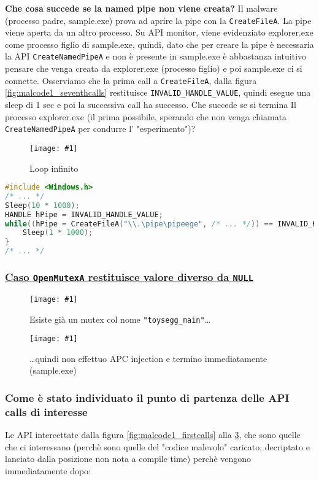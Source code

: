 \documentclass[
    a4paper, %
    11pt %
]{article}
\newcommand{\pic}[4]{\begin{figure}[H]
            \centering
            \texttt{[image: \#1]}
            \caption{#2}
            \label{fig:#1}
            \end{figure}}
\begin{document}
            \textbf{Che cosa succede se la named pipe non viene creata?}
            Il malware (processo padre, sample.exe) prova ad aprire la pipe con la \texttt{CreateFileA}. La pipe viene aperta da un altro 
            processo. Su API monitor, viene evidenziato explorer.exe come processo figlio di
            sample.exe, quindi, dato che per creare la pipe è necessaria la API \texttt{CreateNamedPipeA}
            e non è presente in sample.exe è abbastanza intuitivo pensare che venga creata da explorer.exe (processo figlio) e poi sample.exe ci si connette.
            Osserviamo che la prima call a \texttt{CreateFileA}, dalla figura \ref{fig:malcode1_seventhcalls}
            restituisce \texttt{INVALID\_HANDLE\_VALUE}, quindi esegue una sleep di 1 sec e poi la successiva call
            ha successo. Che succede se si termina Il processo explorer.exe (il prima possibile, sperando che
            non venga chiamata \texttt{CreateNamedPipeA} per condurre l' "esperimento")?
            \pic{malcode3_killchild}{Loop infinito}{13cm}{4cm}

            \begin{lstlisting}[language=C]
#include <Windows.h>
/* ... */
Sleep(10 * 1000);
HANDLE hPipe = INVALID_HANDLE_VALUE;
while((hPipe = CreateFileA("\\.\pipe\pipeege", /* ... */)) == INVALID_HANDLE_VALUE) {
    Sleep(1 * 1000);
}
/* ... */
            \end{lstlisting}

            \subsubsection*{\underline{Caso \texttt{OpenMutexA} restituisce valore diverso da \texttt{NULL}}}
            \pic{malcode2_fifthcalls}{Esiste già un mutex col nome \texttt{"toysegg\_main"}\dots}{11cm}{1.5cm}
            \pic{malcode2_sixthcalls}{\dots quindi non effettuo APC injection e termino immediatamente (sample.exe)}{3cm}{0.75cm}

            \subsubsection*{Come è stato individuato il punto di partenza delle API calls di interesse}

            Le API intercettate dalla figura \ref{fig:malcode1_firstcalls} alla \ref{fig:malcode2_sixthcalls},
            che sono quelle che ci interessano (perchè sono quelle del "codice malevolo" caricato, decriptato e 
            lanciato dalla posizione non nota a compile time) perchè vengono immediatamente dopo:
\end{document}
